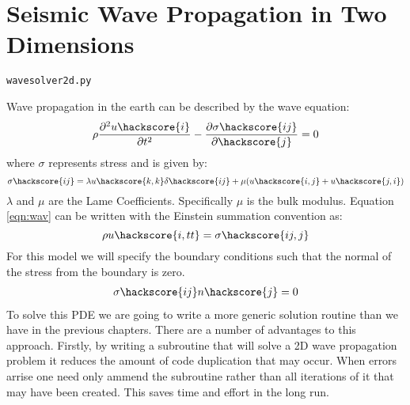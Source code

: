 
%
%
%

\section{Seismic Wave Propagation in Two Dimensions}

\verb|wavesolver2d.py|

Wave propagation in the earth can be described by the wave equation:
\begin{equation} \label{eqn:wav} \index{wave equation}
\rho \frac{\partial^{2}u\hackscore{i}}{\partial t^2} - \frac{\partial \sigma\hackscore{ij}}{\partial\hackscore{j}} = 0
\end{equation}
where $\sigma$ represents stress and is given by:
\begin{equation} \label{eqn:sigw}
 \sigma \hackscore{ij} = \lambda u\hackscore{k,k} \delta\hackscore{ij} + \mu ( u\hackscore{i,j} + u\hackscore{j,i})
\end{equation}
$\lambda$ and $\mu$ are the Lame Coefficients. Specifically $\mu$ is the bulk modulus. Equation \ref{eqn:wav} can be written with the Einstein summation convention as:
\begin{equation}
 \rho u\hackscore{i,tt} = \sigma\hackscore{ij,j}
\end{equation}
For this model we will specify the boundary conditions such that the normal of the stress from the boundary is zero.
\begin{eqnarray} \label{eqn:bdw}
\sigma \hackscore{ij}n\hackscore{j}=0
\end{eqnarray}
To solve this PDE we are going to write a more generic solution routine than we have in the previous chapters. There are a number of advantages to this approach. Firstly, by writing a subroutine that will solve a 2D wave propagation problem it reduces the amount of code duplication that may occur. When errors arrise one need only ammend the subroutine rather than all iterations of it that may have been created. This saves time and effort in the long run. 

